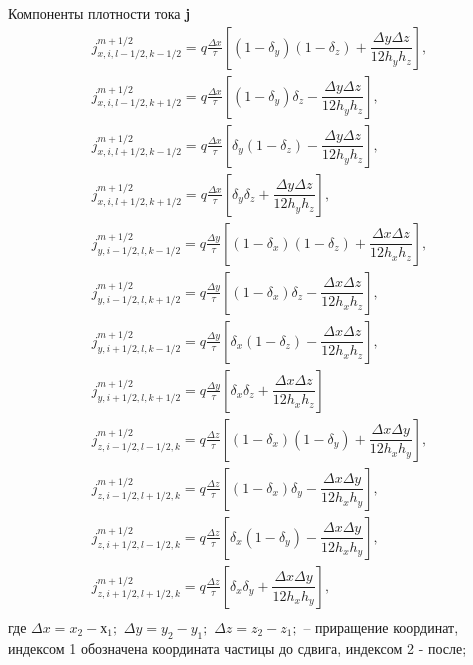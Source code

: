 Компоненты плотности тока \textbf{j}
\begin{equation}
\begin{array}{c}
j_{x,i,l-1/2,k-1/2}^{m+1/2}=q\frac{\Delta x}{\tau}\left[(1-\delta_{y})(1-\delta_{z})+\dfrac{\Delta y \Delta z}{12 h_{y}h_{z}}
\right], \\
j_{x,i,l-1/2,k+1/2}^{m+1/2}=q\frac{\Delta x}{\tau}\left[(1-\delta_{y})\delta_{z}-\dfrac{\Delta y \Delta z}{12 h_{y}h_{z}}
\right], \\
j_{x,i,l+1/2,k-1/2}^{m+1/2}=q\frac{\Delta x}{\tau}\left[\delta_{y}(1-\delta_{z})-\dfrac{\Delta y \Delta z}{12 h_{y}h_{z}}
\right], \\
j_{x,i,l+1/2,k+1/2}^{m+1/2}=q\frac{\Delta x}{\tau}\left[\delta_{y}\delta_{z}+\dfrac{\Delta y \Delta z}{12 h_{y}h_{z}}
\right], \\
j_{y,i-1/2,l,k-1/2}^{m+1/2}=q\frac{\Delta y}{\tau}\left[(1-\delta_{x})(1-\delta_{z})+\dfrac{\Delta x \Delta z}{12 h_{x}h_{z}}
\right], \\
j_{y,i-1/2,l,k+1/2}^{m+1/2}=q\frac{\Delta y}{\tau}\left[(1-\delta_{x})\delta_{z}-\dfrac{\Delta x \Delta z}{12 h_{x}h_{z}}
\right], \\
j_{y,i+1/2,l,k-1/2}^{m+1/2}=q\frac{\Delta y}{\tau}\left[\delta_{x}(1-\delta_{z})-\dfrac{\Delta x \Delta z}{12 h_{x}h_{z}}
\right], \\
j_{y,i+1/2,l,k+1/2}^{m+1/2}=q\frac{\Delta y}{\tau}\left[\delta_{x}\delta_{z}+\dfrac{\Delta x \Delta z}{12 h_{x}h_{z}}
\right] \\
j_{z,i-1/2,l-1/2,k}^{m+1/2}=q\frac{\Delta z}{\tau}\left[(1-\delta_{x})(1-\delta_{y})+\dfrac{\Delta x \Delta y}{12 h_{x}h_{y}}
\right], \\
j_{z,i-1/2,l+1/2,k}^{m+1/2}=q\frac{\Delta z}{\tau}\left[(1-\delta_{x})\delta_{y}-\dfrac{\Delta x \Delta y}{12 h_{x}h_{y}}
\right], \\
j_{z,i+1/2,l-1/2,k}^{m+1/2}=q\frac{\Delta z}{\tau}\left[\delta_{x}(1-\delta_{y})-\dfrac{\Delta x \Delta y}{12 h_{x}h_{y}}
\right], \\
j_{z,i+1/2,l+1/2,k}^{m+1/2}=q\frac{\Delta z}{\tau}\left[\delta_{x}\delta_{y}+\dfrac{\Delta x \Delta y}{12 h_{x}h_{y}}
\right], \\
\end{array}
\end{equation}
где $\Delta x=x_{2}-х_{1};$ $\Delta y=y_{2}-y_{1};$ $\Delta z=z_{2}-z_{1};$ -- приращение координат, индексом 1 обозначена координата частицы до сдвига, индексом 2 - после; 



